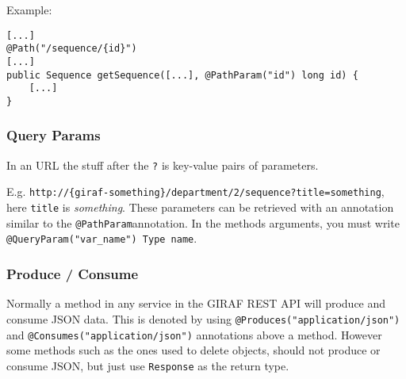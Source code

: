 \newpage
\noindent
Example:
\begin{lstlisting}
[...]
@Path("/sequence/{id}")
[...]
public Sequence getSequence([...], @PathParam("id") long id) {
    [...]
}
\end{lstlisting}

\subsubsection{Query Params}
In an URL the stuff after the \texttt{?} is key-value pairs of parameters.

E.g. \texttt{http://\{giraf-something\}/department/2/sequence?title=something}, here \texttt{title} is \textit{something}.
These parameters can be retrieved with an annotation similar to the \texttt{@PathParam}annotation.
In the methods arguments, you must write \texttt{@QueryParam("var\_name") Type name}.


\subsubsection{Produce / Consume}
Normally a method in any service in the GIRAF REST API will produce and consume JSON data. This is denoted by using \texttt{@Produces("application/json")} and \texttt{@Consumes("application/json")} annotations above a method.
However some methods such as the ones used to delete objects, should not produce or consume JSON, but just use \texttt{Response} as the return type.

